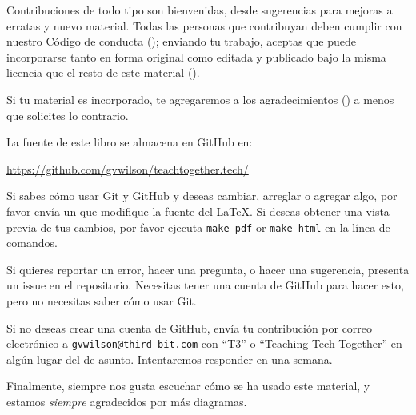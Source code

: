 
Contribuciones de todo tipo son bienvenidas,
desde sugerencias para mejoras a erratas y nuevo material.
Todas las personas que contribuyan deben cumplir con nuestro Código de conducta ();
enviando tu trabajo,
aceptas que puede incorporarse tanto en forma original como editada
y publicado bajo la misma licencia que el resto de este material ().

Si tu material es incorporado,
te agregaremos a los agradecimientos () a menos que solicites lo contrario.

La fuente de este libro se almacena en GitHub en:

\begin{center}
  \url{https://github.com/gvwilson/teachtogether.tech/}
\end{center}

\noindent
Si sabes cómo usar Git y GitHub y deseas cambiar, arreglar o agregar algo,
por favor envía un  que modifique la fuente del LaTeX.
Si deseas obtener una vista previa de tus cambios,
por favor ejecuta \texttt{make~pdf} or \texttt{make~html} en la línea de comandos.

Si quieres reportar un error,
hacer una pregunta,
o hacer una sugerencia,
presenta un issue en el repositorio.
Necesitas tener una cuenta de GitHub para hacer esto,
pero no necesitas saber cómo usar Git.

Si no deseas crear una cuenta de GitHub,
envía tu contribución por correo electrónico a \texttt{gvwilson@third-bit.com}
con ``T3'' o ``Teaching Tech Together'' en algún lugar del de asunto.
Intentaremos responder en una semana.

Finalmente,
siempre nos gusta escuchar cómo se ha usado este material,
y estamos \emph{siempre} agradecidos por más diagramas.
